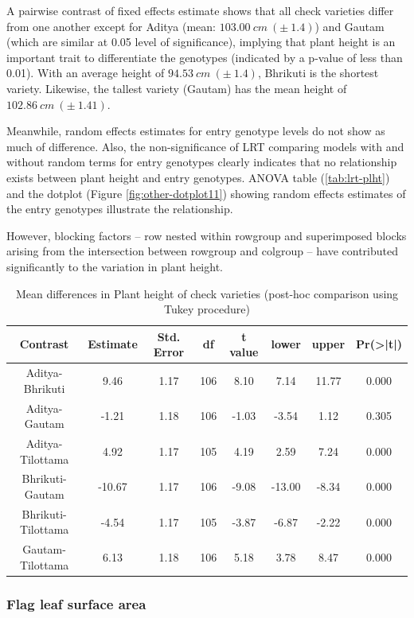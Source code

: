 \documentclass[12pt,oneside]{dukestatscithesis} %
\begin{document}
A pairwise contrast of fixed effects estimate shows that all check varieties differ from one another except for Aditya (mean: \(103.00\ cm\ (\pm\ 1.4)\)) and Gautam (which are similar at 0.05 level of significance), implying that plant height is an important trait to differentiate the genotypes (indicated by a p-value of less than 0.01). With an average height of \(94.53\ cm\ (\pm\ 1.4)\), Bhrikuti is the shortest variety. Likewise, the tallest variety (Gautam) has the mean height of \(102.86\ cm\ (\pm\ 1.41)\).

Meanwhile, random effects estimates for entry genotype levels do not show as much of difference. Also, the non-significance of LRT comparing models with and without random terms for entry genotypes clearly indicates that no relationship exists between plant height and entry genotypes. ANOVA table (\ref{tab:lrt-plht}) and the dotplot (Figure \ref{fig:other-dotplot11}) showing random effects estimates of the entry genotypes illustrate the relationship.

However, blocking factors -- row nested within rowgroup and superimposed blocks arising from the intersection between rowgroup and colgroup -- have contributed significantly to the variation in plant height.
\begin{table}[H]

\caption{\label{tab:other-meanconf-tab1}Mean differences in Plant height of check varieties (post-hoc comparison using Tukey procedure)}
\centering
\begin{tabular}[t]{cccccccc}
\toprule
Contrast & Estimate & Std. Error & df & t value & lower & upper & Pr(>|t|)\\
\midrule
Aditya-Bhrikuti & 9.46 & 1.17 & 106 & 8.10 & 7.14 & 11.77 & 0.000\\
Aditya-Gautam & -1.21 & 1.18 & 106 & -1.03 & -3.54 & 1.12 & 0.305\\
Aditya-Tilottama & 4.92 & 1.17 & 105 & 4.19 & 2.59 & 7.24 & 0.000\\
Bhrikuti-Gautam & -10.67 & 1.17 & 106 & -9.08 & -13.00 & -8.34 & 0.000\\
Bhrikuti-Tilottama & -4.54 & 1.17 & 105 & -3.87 & -6.87 & -2.22 & 0.000\\
Gautam-Tilottama & 6.13 & 1.18 & 106 & 5.18 & 3.78 & 8.47 & 0.000\\
\bottomrule
\end{tabular}
\end{table}
\hypertarget{flag-leaf-surface-area}{%
\subsubsection{Flag leaf surface area}\label{flag-leaf-surface-area}}
\end{document}
